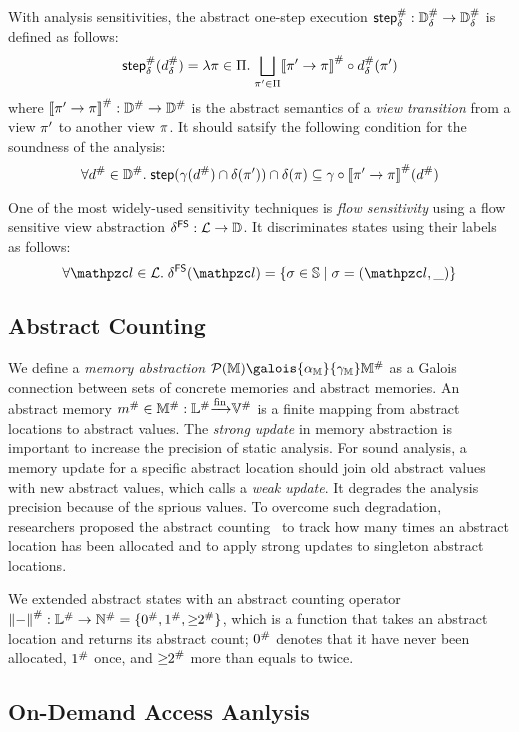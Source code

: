 With analysis sensitivities, the abstract one-step execution ${\textsf{step}}^{\#}_\delta:
{\mathbb{D}}^{\#}_\delta \rightarrow {\mathbb{D}}^{\#}_\delta$ is defined as follows:
\[
  {\textsf{step}}^{\#}_\delta({d}^{\#}_\delta) = \lambda \pi \in \Pi. \; \underset{\pi' \in
  \Pi}{\bigsqcup}{{[\![{\pi' \rightarrow \pi}]\!]}^{\#} \circ {d}^{\#}_\delta(\pi')}
\]
where ${[\![{\pi' \rightarrow \pi}]\!]}^{\#}: {\mathbb{D}}^{\#} \rightarrow {\mathbb{D}}^{\#}$ is the abstract
semantics of a \textit{view transition} from a view $\pi'$ to another view
$\pi$.  It should satsify the following condition for the soundness of the
analysis:
\[
  \forall {d}^{\#} \in {\mathbb{D}}^{\#}. \; \textsf{step}(\gamma({d}^{\#}) \cap \delta(\pi'))
  \cap \delta(\pi) \subseteq \gamma \circ
  {[\![{\pi' \rightarrow \pi}]\!]}^{\#}({d}^{\#})
\]

One of the most widely-used sensitivity techniques is \textit{flow sensitivity}
using a flow sensitive view abstraction $\delta^{\textsf{FS}}: \mathcal{L} \rightarrow \mathbb{D}$.
It discriminates states using their labels as follows:
\[
  \forall \lab \in \labset. \; \fsviewmap(\lab) = \{ \st \in \stset \mid \st =
  (\lab, \_) \}
\]


\subsection{Abstract Counting}

We define a \textit{memory abstraction} $\powerset{\memset}
\galois{\alpha_\memset}{\gamma_\memset} \absmemset$ as a Galois connection
between sets of concrete memories and abstract memories.  An abstract memory
${m}^{\#} \in {\mathbb{M}}^{\#}: {\mathbb{L}}^{\#} {\xrightarrow[]{\text{fin}}} {\mathbb{V}}^{\#}$ is a finite mapping from
abstract locations to abstract values.  The \textit{strong update} in memory
abstraction is important to increase the precision of static analysis.  For
sound analysis, a memory update for a specific abstract location should join old
abstract values with new abstract values, which calls a \textit{weak update}.
It degrades the analysis precision because of the sprious values.  To overcome
such degradation, researchers proposed the abstract
counting~\cite{abstract-gc-counting, revisit-recency} to track how many times an
abstract location has been allocated and to apply strong updates to singleton
abstract locations.

We extended abstract states with an abstract counting operator ${\lVert-\rVert}^{\#}:
{\mathbb{L}}^{\#} \rightarrow {\mathbb{N}}^{\#} = \{ {0}^{\#}, {1}^{\#}, {\geq\!\!2}^{\#} \}$, which
is a function that takes an abstract location and returns its abstract count;
${0}^{\#}$ denotes that it have never been allocated, ${1}^{\#}$ once, and
${\geq\!\!2}^{\#}$ more than equals to twice.


\subsection{On-Demand Access Aanlysis}
